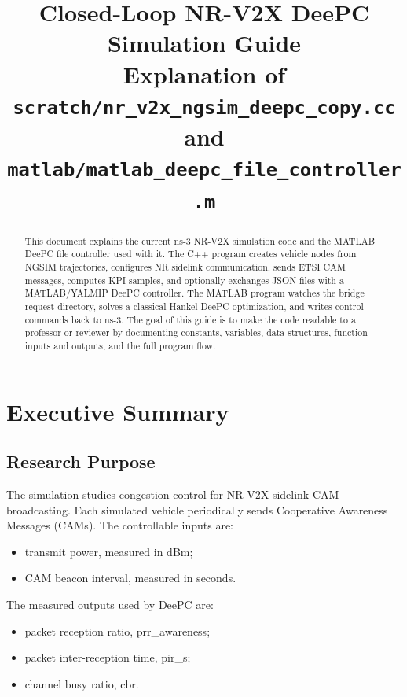 \documentclass[11pt]{article}
\title{
  Closed-Loop NR-V2X DeePC Simulation Guide\\
  \large Explanation of \texttt{scratch/nr\_v2x\_ngsim\_deepc\_copy.cc} and
  \texttt{matlab/matlab\_deepc\_file\_controller.m}
}
\author{}
\date{}
\DeclareRobustCommand{\code}[1]{\texttt{\detokenize{#1}}}
\def\code#1{#1}%
\begin{document}
\maketitle

\begin{abstract}
This document explains the current ns-3 NR-V2X simulation code and the MATLAB
DeePC file controller used with it.  The C++ program creates vehicle nodes from
NGSIM trajectories, configures NR sidelink communication, sends ETSI CAM
messages, computes KPI samples, and optionally exchanges JSON files with a
MATLAB/YALMIP DeePC controller.  The MATLAB program watches the bridge request
directory, solves a classical Hankel DeePC optimization, and writes control
commands back to ns-3.  The goal of this guide is to make the code readable to a
professor or reviewer by documenting constants, variables, data structures,
function inputs and outputs, and the full program flow.
\end{abstract}

\tableofcontents
\newpage

\section{Executive Summary}

\subsection{Research Purpose}

The simulation studies congestion control for NR-V2X sidelink CAM broadcasting.
Each simulated vehicle periodically sends Cooperative Awareness Messages (CAMs).
The controllable inputs are:

\begin{itemize}
  \item transmit power, measured in dBm;
  \item CAM beacon interval, measured in seconds.
\end{itemize}

The measured outputs used by DeePC are:

\begin{itemize}
  \item packet reception ratio, \code{prr_awareness};
  \item packet inter-reception time, \code{pir_s};
  \item channel busy ratio, \code{cbr}.
\end{itemize}
\end{document}
